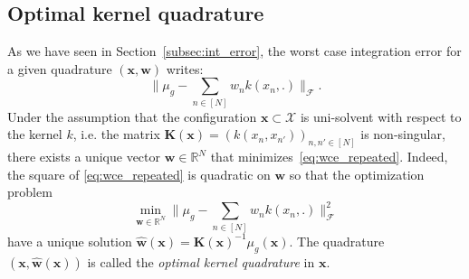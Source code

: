 \documentclass[twoside,11pt]{book}
\numberwithin{theorem}{chapter}
\numberwithin{definition}{chapter}
\numberwithin{proposition}{chapter}
\numberwithin{corollary}{chapter}
\numberwithin{example}{chapter}
\numberwithin{lemma}{chapter}
\numberwithin{assumption}{chapter}
\numberwithin{equation}{chapter}
\numberwithin{figure}{chapter}
\begin{document}

\subsection{Optimal kernel quadrature}
\label{subsec:okq_analysis_paradigm}

As we have seen in Section~\ref{subsec:int_error}, the worst case integration error for a given quadrature $(\bm{x}, \bm{w})$ writes:
\begin{equation}\label{eq:wce_repeated}
\bigg \|\mu_{g} - \sum\limits_{n \in [N]} w_{n}k(x_{n},.) \bigg\|_{\mathcal{F}}.
\end{equation}
Under the assumption that the configuration  $\bm{x} \subset \mathcal{X}$ is uni-solvent with respect to the kernel $k$, i.e. the matrix $\bm{K}(\bm{x}) = (k(x_{n},x_{n'}))_{n,n' \in [N]}$ is non-singular, there exists a unique vector $\bm{w} \in \mathbb{R}^{N}$ that minimizes~\eqref{eq:wce_repeated}. Indeed, the square of \eqref{eq:wce_repeated} is quadratic on $\bm{w}$ so that the optimization problem
\begin{equation}\label{eq:wce_repeated_optimization}
\min\limits_{\bm{w} \in \mathbb{R}^{N}} \bigg \|\mu_{g} - \sum\limits_{n \in [N]} w_{n}k(x_{n},.) \bigg\|_{\mathcal{F}}^{2}
\end{equation}
have a unique solution $\hat{\bm{w}}(\bm{x}) = \bm{K}(\bm{x})^{-1}\mu_{g}(\bm{x})$. The quadrature $(\bm{x},\hat{\bm{w}}(\bm{x}))$ is called the \emph{optimal kernel quadrature} in $\bm{x}$. 
\end{document}

